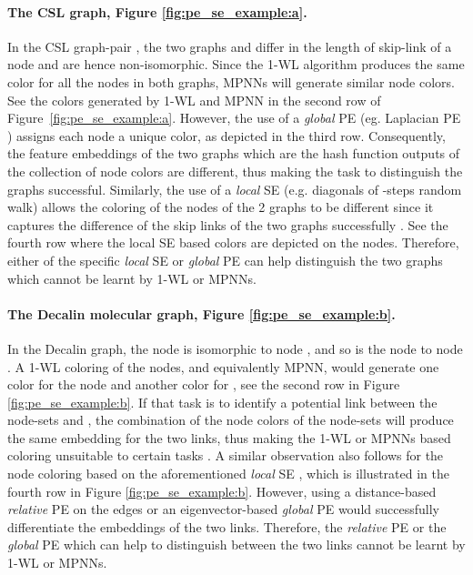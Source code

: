 \documentclass{article}
\begin{document}
\paragraph{The CSL graph, Figure \ref{fig:pe_se_example:a}.}
In the CSL graph-pair \cite{murphy2019relational},
the two graphs  and  differ in the length of skip-link of a node and are hence non-isomorphic. Since the 1-WL algorithm produces the same color for all the nodes in both graphs, MPNNs will generate similar node colors. See the colors generated by 1-WL and MPNN in the second row of Figure~\ref{fig:pe_se_example:a}. 
However, the use of a \textit{global} PE (eg. Laplacian PE \cite{dwivedi2020benchmarking}) assigns each node a unique color, as depicted in the third row. Consequently, the feature embeddings of the two graphs which are the hash function outputs of the collection of node colors are different, thus making the task to distinguish the graphs successful.
Similarly, the use of a \textit{local} SE (e.g. diagonals of -steps random walk) allows the coloring of the nodes of the 2 graphs to be different \cite{dwivedi2022LPE} since it captures the difference of the skip links of the two graphs successfully \cite{loukas2020graph}. See the fourth row where the local SE based colors are depicted on the nodes. Therefore, either of the specific \textit{local} SE or \textit{global} PE can help distinguish the two graphs which cannot be learnt by 1-WL or MPNNs.

\paragraph{The Decalin molecular graph, Figure \ref{fig:pe_se_example:b}.}
In the Decalin graph,
the node  is isomorphic to node , and so is the node  to node . A 1-WL coloring of the nodes, and equivalently MPNN, would generate one color for the node  and another color for , see the second row in Figure \ref{fig:pe_se_example:b}. If that task is to identify a potential link between the node-sets  and , the combination of the node colors of the node-sets will produce the same embedding for the two links, thus making the 1-WL or MPNNs based coloring unsuitable to certain tasks \cite{zhang2021labeling}.
A similar observation also follows for the node coloring based on the aforementioned \textit{local} SE \cite{dwivedi2022LPE}, which is illustrated in the fourth row in Figure \ref{fig:pe_se_example:b}. However, using a distance-based \textit{relative} PE on the edges or an eigenvector-based \textit{global} PE would successfully differentiate the embeddings of the two links.
Therefore, the \textit{relative} PE or the \textit{global} PE which can help to distinguish between the two links cannot be learnt by 1-WL or MPNNs.
\end{document}
